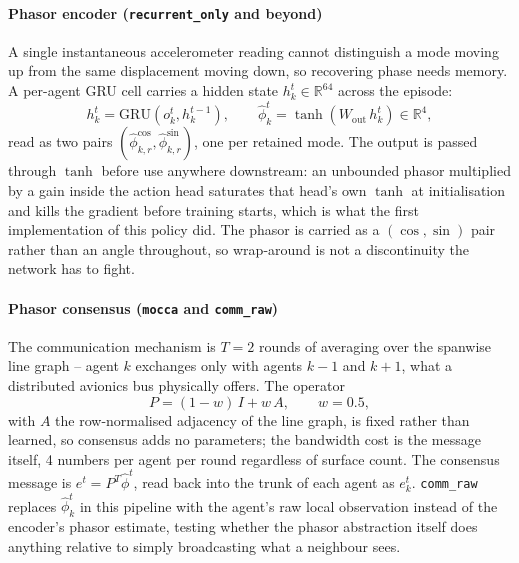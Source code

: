 \documentclass[11pt]{article}
\begin{document}
\paragraph{Phasor encoder (\texttt{recurrent\_only} and beyond)}
A single instantaneous accelerometer reading cannot distinguish a mode
moving up from the same displacement moving down, so recovering phase
needs memory. A per-agent GRU cell \citep{hausknecht2015drqn} carries a
hidden state $h_k^t \in \mathbb{R}^{64}$ across the episode:
\begin{equation}
h_k^t = \mathrm{GRU}\!\left(o_k^t, h_k^{t-1}\right), \qquad
\hat\phi_k^t = \tanh\!\left(W_{\mathrm{out}}\, h_k^t\right) \in \mathbb{R}^{4},
\label{eq:encoder}
\end{equation}
read as two pairs $(\hat\phi_{k,r}^{\cos}, \hat\phi_{k,r}^{\sin})$, one per
retained mode. The output is passed through $\tanh$ before use anywhere
downstream: an unbounded phasor multiplied by a gain inside the action head
saturates that head's own $\tanh$ at initialisation and kills the gradient
before training starts, which is what the first implementation of this
policy did. The phasor is carried as a $(\cos,\sin)$ pair rather than an
angle throughout, so wrap-around is not a discontinuity the network has to
fight.

\paragraph{Phasor consensus (\texttt{mocca} and \texttt{comm\_raw})}
The communication mechanism is $T{=}2$ rounds of averaging over the
spanwise line graph -- agent $k$ exchanges only with agents $k{-}1$ and
$k{+}1$, what a distributed avionics bus physically offers. The operator
\begin{equation}
P = (1-w)\,I + w\,A, \qquad w = 0.5,
\label{eq:consensus-operator}
\end{equation}
with $A$ the row-normalised adjacency of the line graph, is fixed rather
than learned, so consensus adds no parameters; the bandwidth cost is the
message itself, 4 numbers per agent per round regardless of surface count.
The consensus message is $e^t = P^T \hat\phi^t$, read back into the trunk
of each agent as $e_k^t$. \texttt{comm\_raw} replaces $\hat\phi_k^t$ in this
pipeline with the agent's raw local observation instead of the encoder's
phasor estimate, testing whether the phasor abstraction itself does
anything relative to simply broadcasting what a neighbour sees.
\end{document}

